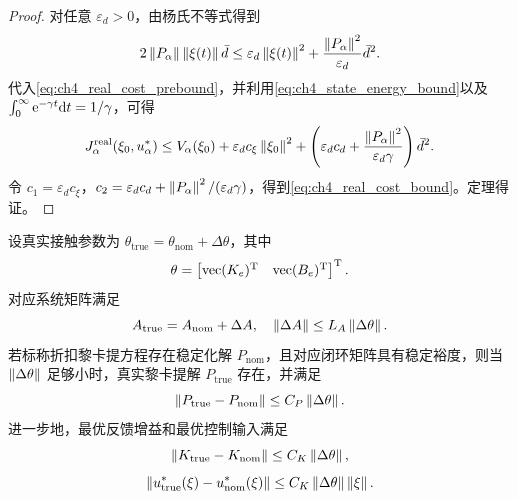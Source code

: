 \begin{proof}
对任意 $\varepsilon_d>0$，由杨氏不等式得到
\begin{equation}
  2\left\lVert P_\alpha\right\rVert\left\lVert \xi(t)\right\rVert\bar d\le \varepsilon_d\left\lVert \xi(t)\right\rVert^2+\frac{\left\lVert P_\alpha\right\rVert^2}{\varepsilon_d}\bar d^2 .
\end{equation}
代入\eqref{eq:ch4_real_cost_prebound}，并利用\eqref{eq:ch4_state_energy_bound}以及 $\int_0^\infty \mathrm{e}^{-\gamma t}\mathrm{d} t=1/\gamma$，可得
\begin{equation}
  J_\alpha^{\mathrm{real}}(\xi_0,u_\alpha^*)\le V_\alpha(\xi_0)+\varepsilon_d c_\xi\left\lVert \xi_0\right\rVert^2+\left(\varepsilon_d c_d+\frac{\left\lVert P_\alpha\right\rVert^2}{\varepsilon_d\gamma}\right)\bar d^2 .
\end{equation}
令 $c_1=\varepsilon_d c_\xi$，$c_2=\varepsilon_d c_d+\left\lVert P_\alpha\right\rVert^2/(\varepsilon_d\gamma)$，得到\eqref{eq:ch4_real_cost_bound}。定理得证。
\end{proof}

\begin{theorem}[接触模型参数误差下的最优反馈误差界]
\label{thm:ch4_param_mismatch}
设真实接触参数为 $\theta_{\mathrm{true}}=\theta_{\mathrm{nom}}+\Delta\theta$，其中
\begin{equation}
  \theta=\begin{bmatrix}\operatorname{vec}(K_e)^{\mathrm{T}}&\operatorname{vec}(B_e)^{\mathrm{T}}\end{bmatrix}^{\mathrm{T}} .
\end{equation}
对应系统矩阵满足
\begin{equation}
  A_{\mathrm{true}}=A_{\mathrm{nom}}+\Delta A,
  \quad \left\lVert \Delta A\right\rVert\le L_A\left\lVert \Delta\theta\right\rVert .
  \label{eq:ch4_A_mismatch}
\end{equation}
若标称折扣黎卡提方程存在稳定化解 $P_{\mathrm{nom}}$，且对应闭环矩阵具有稳定裕度，则当 $\left\lVert \Delta\theta\right\rVert$ 足够小时，真实黎卡提解 $P_{\mathrm{true}}$ 存在，并满足
\begin{equation}
  \left\lVert P_{\mathrm{true}}-P_{\mathrm{nom}}\right\rVert\le C_P\left\lVert \Delta\theta\right\rVert .
  \label{eq:ch4_P_error}
\end{equation}
进一步地，最优反馈增益和最优控制输入满足
\begin{equation}
  \left\lVert K_{\mathrm{true}}-K_{\mathrm{nom}}\right\rVert\le C_K\left\lVert \Delta\theta\right\rVert,
  \label{eq:ch4_K_error}
\end{equation}
\begin{equation}
  \left\lVert u_{\mathrm{true}}^*(\xi)-u_{\mathrm{nom}}^*(\xi)\right\rVert\le C_K\left\lVert \Delta\theta\right\rVert\left\lVert \xi\right\rVert .
  \label{eq:ch4_u_error}
\end{equation}
\end{theorem}


